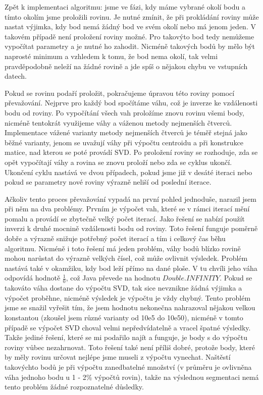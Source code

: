 \documentclass[11pt,twoside,a4paper]{book}
\begin{document}
Zpět k implementaci algoritmu: jsme ve fázi, kdy máme vybrané okolí bodu a tímto okolím jsme proložili rovinu. Je nutné zmínit, že při prokládání roviny může nastat výjimka, kdy bod nemá žádný bod ve svém okolí nebo má jenom jeden. V takovém případě není proložení roviny možné. Pro takovýto bod tedy nemůžeme vypočítat parametry a je nutné ho zahodit. Nicméně takových bodů by mělo být naprosté minimum a vzhledem k tomu, že bod nema okolí, tak velmi pravděpodobně neleží na žádné rovině a jde spíš o nějakou chybu ve vstupních datech. 

Pokud se rovinu podaří proložit, pokračujeme úpravou této roviny pomocí převažování. Nejprve pro každý bod spočítáme váhu, což je inverze ke vzdálenosti bodu od roviny. Po vypočítání všech vah proložíme znovu rovinu všemi body, nicméně tentokrát využijeme váhy a váženou metody nejmenších čtverců. Implementace vážené varianty metody nejmenších čtverců je téměř stejná jako běžné varianty, jenom se uvažují váhy při výpočtu centroidu a při konstrukce matice, nad kterou se poté provádí SVD. Po proložení roviny se rozhoduje, zda se opět vypočítají váhy a rovina se znovu proloží nebo zda se cyklus ukončí. Ukončení cyklu nastává ve dvou případech, pokud jsme již v desáté iteraci nebo pokud se parametry nové roviny výrazně neliší od poslední iterace.

Ačkoliv tento proces převažování vypadá na první pohled jednoduše, narazil jsem při něm na dva problémy. Prvním je výpočet vah, které se v rámci iterací mění pomalu a provádí se zbytečně velký počet iterací. Jako řešení se nabízí použít inverzi k druhé mocnině vzdálenosti bodu od roviny. Toto řešení funguje poměrně dobře a výrazně snižuje potřebný počet iterací a tím i celkový čas běhu algoritmu. Nicméně i toto řešení má jeden problém, váhy bodů blízko rovině mohou narůstat do výrazně velkých čísel, což může ovlivnit výsledek. Problém nastává také v okamžiku, kdy bod leží přímo na dané ploše. V tu chvíli jeho váha odpovídá hodnotě $\frac{1}{0}$, což Java převede na hodnotu $Double.INFINITY$. Pokud se takováto váha dostane do výpočtu SVD, tak sice nevznikne žádná výjimka a výpočet proběhne, nicméně výsledek je výpočtu je vždy chybný. Tento problém jsme se snažil vyřešit tím, že jsem hodnotu nekonečna nahrazoval nějakou velkou konstantou (zkoušel jsem různé varianty od 10e5 do 10e50), nicméně v tomto případě se výpočet SVD choval velmi nepředvídatelně a vracel špatné výsledky. Takže jediné řešení, které se mi podařilo najít a funguje, je body s  do výpočtu roviny vůbec nezahrnovat. Toto řešení také není příliš dobré, protože body, které by měly rovinu určovat nejlépe jsme museli z výpočtu vynechat. Naštěstí takovýchto bodů je při výpočtu zanedbatelné množství (v průměru je ovlivněna váha jednoho bodu u 1 - 2\% výpočtů rovin), takže na výslednou segmentaci nemá tento problém žádné rozpoznatelné důsledky.
 
\end{document}
